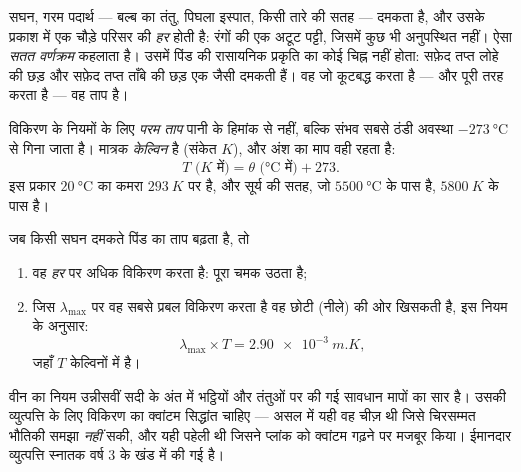 \begin{definition}[सतत वर्णक्रम]\label{def:g10:light-spectra:continuous}
सघन, गरम पदार्थ --- बल्ब का तंतु, पिघला इस्पात, किसी तारे की सतह ---
दमकता है, और उसके प्रकाश में एक चौड़े परिसर की \emph{हर}
 होती है: रंगों की एक अटूट पट्टी, जिसमें कुछ भी
अनुपस्थित नहीं। ऐसा  \emph{सतत वर्णक्रम} कहलाता है। उसमें पिंड की रासायनिक प्रकृति का कोई चिह्न नहीं
होता: सफ़ेद तप्त लोहे की छड़ और सफ़ेद तप्त ताँबे की छड़ एक जैसी दमकती
हैं। वह जो कूटबद्ध करता है --- और पूरी तरह करता है --- वह ताप है।
\end{definition}

\begin{definition}[परम ताप]\label{def:g10:light-spectra:kelvin}
विकिरण के नियमों के लिए \emph{परम ताप} पानी के हिमांक से
नहीं, बल्कि संभव सबसे ठंडी अवस्था $\qty{-273}{\degreeCelsius}$ से गिना जाता है। मात्रक
\emph{केल्विन} है (संकेत $\unit{K}$), और अंश का माप वही रहता
है:
\[
T \text{ (}\unit{K}\text{ में)} = \theta \text{ (}\unit{\degreeCelsius}\text{ में)} + 273 .
\]
इस प्रकार $\qty{20}{\degreeCelsius}$ का कमरा $\qty{293}{K}$ पर है, और सूर्य की सतह, जो $\qty{5500}{\degreeCelsius}$ के
पास है, $\qty{5800}{K}$ के पास है।
\end{definition}

\begin{proposition}\label{prop:g10:light-spectra:wien}
जब किसी सघन दमकते पिंड का ताप बढ़ता है, तो
\begin{enumerate}
  \item वह \emph{हर}  पर अधिक विकिरण करता है: पूरा
         चमक उठता है;
  \item जिस  $\lambda_{\max}$ पर वह सबसे प्रबल विकिरण करता है
        वह छोटी  (नीले) की ओर खिसकती है, इस नियम के
        अनुसार:
        \[
        \lambda_{\max} \times T = \qty{2.90e-3}{m.K},
        \]
        जहाँ $T$ केल्विनों में  है।
\end{enumerate}
\end{proposition}
\admitted

\begin{remark}[यह नियम कहाँ से आता है]\label{rem:g10:light-spectra:wienorigin}
वीन का नियम उन्नीसवीं सदी के अंत में भट्ठियों और तंतुओं पर की गई सावधान
मापों का सार है। उसकी व्युत्पत्ति के लिए विकिरण का क्वांटम सिद्धांत
चाहिए --- असल में यही  वह चीज़ थी जिसे चिरसम्मत भौतिकी
समझा \emph{नहीं} सकी, और यही पहेली थी जिसने प्लांक को क्वांटम गढ़ने पर
मजबूर किया। ईमानदार व्युत्पत्ति स्नातक वर्ष 3 के खंड में की गई है।
\end{remark}


